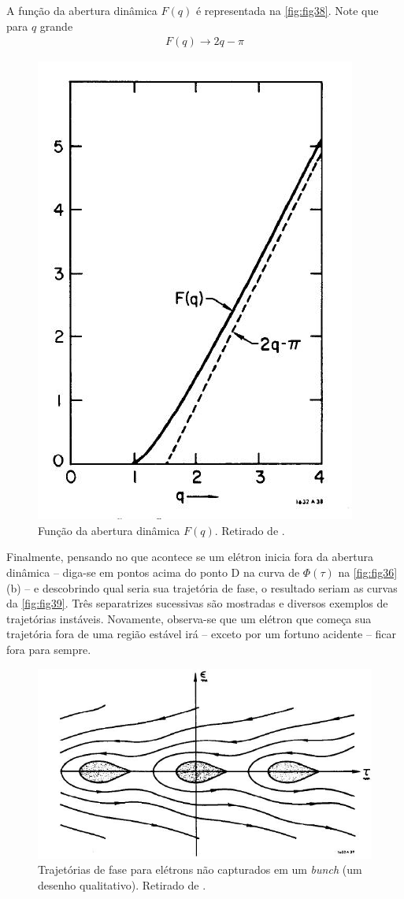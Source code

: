 A função da abertura dinâmica $F(q)$ é representada na \autoref{fig:fig38}. Note que para $q$ grande
\begin{align}
	F(q) \rightarrow 2q-\pi
\end{align}

\begin{figure}[!htb]
	\centering
	\includegraphics[width=0.5\linewidth]{./Figuras/fig38.jpeg}
	\caption{Função da abertura dinâmica $F(q)$. Retirado de \cite{sands1970physics}.}
	\label{fig:fig38}
\end{figure}

Finalmente, pensando no que acontece se um elétron inicia fora da abertura dinâmica --  diga-se em pontos acima do ponto D na curva de $\Phi(\tau)$ na \autoref{fig:fig36}(b) -- e descobrindo qual seria sua trajetória de fase, o resultado seriam as curvas da \autoref{fig:fig39}. Três separatrizes sucessivas são mostradas e diversos exemplos de trajetórias instáveis. Novamente, observa-se que um elétron que começa sua trajetória fora de uma região estável irá -- exceto por um fortuno acidente -- ficar fora para sempre.

\begin{figure}[!htb]
	\centering
	\includegraphics[width=0.7\linewidth]{./Figuras/fig39.jpeg}
	\caption{Trajetórias de fase para elétrons não capturados em um \textit{bunch} (um desenho qualitativo). Retirado de \cite{sands1970physics}.}
	\label{fig:fig39}
\end{figure}